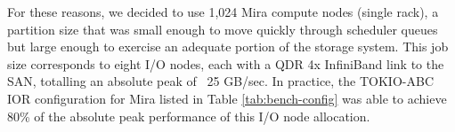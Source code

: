 For these reasons, we decided to use 1,024 Mira compute nodes (single
rack), a partition size that was small enough to move quickly through
scheduler queues but large enough to exercise an adequate portion of the
storage system.  This job size corresponds to eight I/O nodes, each with a QDR 4x InfiniBand link to the SAN, totalling an absolute peak of ~25 GB/sec.
In practice, the TOKIO-ABC IOR configuration for Mira listed in Table \ref{tab:bench-config} was able to achieve 80\% of the absolute peak performance of this I/O node allocation.

